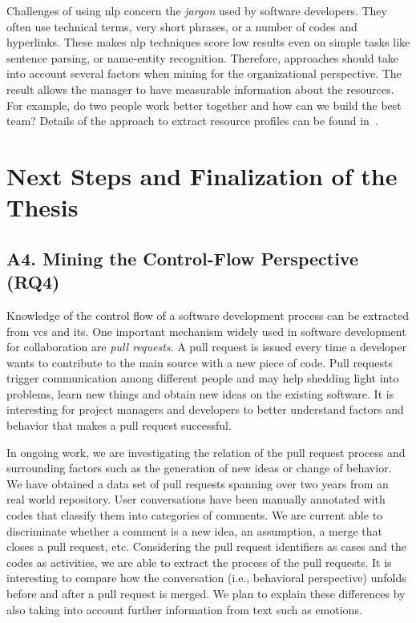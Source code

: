 \documentclass[a4paper,11pt]{article}
\begin{document}
Challenges of using \gls{nlp} concern the \emph{jargon} used by software developers. They often use technical terms, very short phrases, or a number of codes and hyperlinks. These makes \gls{nlp} techniques score low results even on simple tasks like sentence parsing, or name-entity recognition. Therefore, approaches should take into account several factors when mining for the organizational perspective. 
The result allows the manager to have measurable information about the resources. For example, do two people work better together and how can we build the best team? Details of the approach to extract resource profiles can be found in~\cite{Agrawal2016}. 

\section{Next Steps and Finalization of the Thesis}
\label{sec:next-steps}

\subsection{A4. Mining the Control-Flow Perspective (RQ4)}

Knowledge of the control flow of a software development process can be extracted from \gls{vcs} and \gls{its}. One important mechanism widely used in software development for collaboration are \emph{pull requests}. A pull request is issued every time a developer wants to contribute to the main source with a new piece of code. Pull requests trigger communication among different people and may help shedding light into problems, learn new things and obtain new ideas on the existing software. It is interesting for project managers and developers to better understand factors and behavior that makes a pull request successful. 

In ongoing work, we are investigating the relation of the pull request process and surrounding factors such as the generation of new ideas or change of behavior. We have obtained a data set of pull requests spanning over two years from an real world repository. User conversations have been manually annotated with codes that classify them into categories of comments. We are current able to discriminate whether a comment is a new idea, an assumption, a merge that closes a pull request, etc. Considering the pull request identifiers as cases and the codes as activities, we are able to extract the process of the pull requests. It is interesting to compare how the conversation (i.e., behavioral perspective) unfolds before and after a pull request is merged. We plan to explain these differences by also taking into account further information from text such as emotions. 
\end{document}
